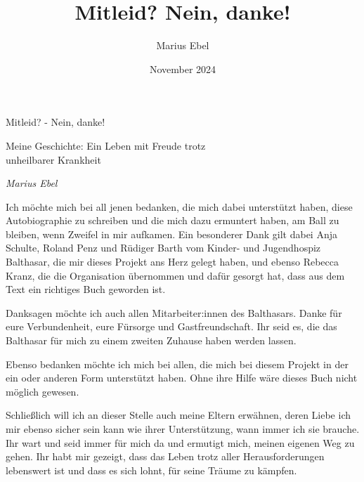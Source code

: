 \documentclass[fontsize=14pt,a4paper,headinclude,DIV=calc,automark]{scrbook}
\title{Mitleid? Nein, danke!}
\author{Marius Ebel}
\date{November 2024}
\begin{document}
\frontmatter

\thispagestyle{empty}

\vspace*{\fill}
\begin{center}
    \huge\textcolor{myblue}{Mitleid? - Nein, danke!}\par
    \vspace{1cm}
    \large\textcolor{myblue}{ Meine Geschichte: Ein Leben mit Freude trotz \\ unheilbarer Krankheit}\par
    \vspace{1cm}
    \normalsize\textcolor{myblue}{\textit{Marius Ebel}}\par
\end{center}
\vspace*{\fill}

\thispagestyle{empty}

\pagestyle{plain}  %
\tableofcontents
\clearpage         %

\vspace{-1\baselineskip}

Ich möchte mich bei all jenen bedanken, die mich dabei unterstützt haben, diese Autobiographie zu schreiben und die mich dazu ermuntert haben, am Ball zu bleiben, wenn Zweifel in mir aufkamen.
Ein besonderer Dank gilt dabei Anja Schulte, Roland Penz und Rüdiger Barth vom Kinder- und Jugendhospiz Balthasar, die mir dieses Projekt ans Herz gelegt haben, und ebenso Rebecca Kranz, die die Organisation übernommen und dafür gesorgt hat, dass aus dem Text ein richtiges Buch geworden ist.

Danksagen möchte ich auch allen Mitarbeiter:innen des Balthasars. Danke für eure Verbundenheit, eure Fürsorge und Gastfreundschaft. Ihr seid es, die das Balthasar für mich zu einem zweiten Zuhause haben werden lassen.

Ebenso bedanken möchte ich mich bei allen, die mich bei diesem Projekt in der ein oder anderen Form unterstützt haben. Ohne ihre Hilfe wäre dieses Buch nicht möglich gewesen.

Schließlich will ich an dieser Stelle auch meine Eltern erwähnen, deren Liebe ich mir ebenso sicher sein kann wie ihrer Unterstützung, wann immer ich sie brauche. Ihr wart und seid immer für mich da und ermutigt mich, meinen eigenen Weg zu gehen. Ihr habt mir gezeigt, dass das Leben trotz aller Herausforderungen lebenswert ist und dass es sich lohnt, für seine Träume zu kämpfen.
\end{document}
